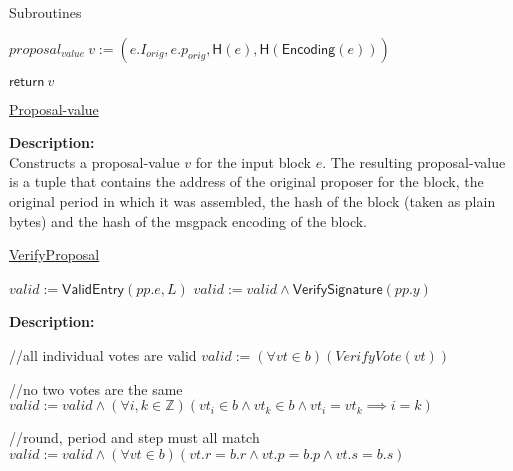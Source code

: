 \documentclass[10pt,a4paper]{article}
\begin{document}
\begin{section}{Subroutines}
\begin{algorithm}[H]
\begin{algorithmic}[1]
    \State $proposal_{value} \ v := (e.I_{orig}, e.p_{orig}, \mathsf{H}(e), \mathsf{H}(\mathsf{Encoding}(e)))$

    \State $\mathsf{return} \ v$

    \EndFunction
    \end{algorithmic}
    \caption{\underline{Proposal-value}}
\end{algorithm}

\noindent \textbf{Description:}\\ Constructs a proposal-value $v$ for the input block $e$.
The resulting proposal-value is a tuple that contains the address of the original proposer for
the block, the original period in which it was assembled, the hash of the block (taken as plain bytes) 
and the hash of the msgpack encoding of the block.


\begin{algorithm}[H]
    \caption{\underline{VerifyProposal}}
    \label{algo:verify-proposal}
    \begin{algorithmic}[1]

    \State $valid := \mathsf{ValidEntry}(pp.e, L)$
    \State $valid := valid \land \mathsf{VerifySignature}(pp.y)$

    \EndFunction
    \end{algorithmic}
\end{algorithm}

\noindent \textbf{Description:}\\


\begin{algorithm}[H]\label{algo:verify-bundle}
    \begin{algorithmic}[1]

    //all individual votes are valid
    \State $valid := (\forall vt \in b)(VerifyVote(vt))$
    
    //no two votes are the same
    \State $valid := valid \land (\forall i,k \in \mathbb{Z})(vt_i \in b \land vt_k \in b \land vt_i = vt_k \implies i=k)$

    //round, period and step must all match
    \State $valid := valid \land (\forall vt \in b)(vt.r = b.r \land vt.p = b.p \land vt.s = b.s)$
  

\end{algorithmic}
\end{algorithm}
\end{section}
\end{document}
